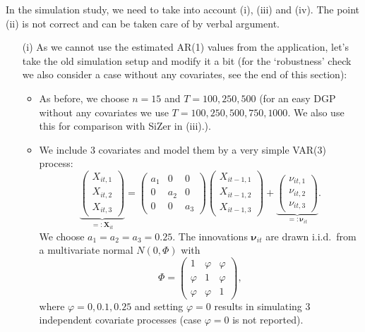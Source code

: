 \documentclass[a4paper,12pt]{article}
\begin{document}
\begin{enumerate}[label=\arabic*.,leftmargin=0.6cm]
{\color{blue}  
In the simulation study, we need to take into account (i), (iii) and (iv). The point (ii) is not correct and can be taken care of by verbal argument.
\begin{itemize}[topsep=0pt]
 
\item[(i)] As we cannot use the estimated AR(1) values from the application, let's take the old simulation setup and modify it a bit {\color{red} (for the `robustness' check we also consider a case without any covariates, see the end of this section)}: 

\begin{itemize}[label=--,leftmargin=0.45cm,itemsep=0pt]

\item As before, we choose $n=15$ and $T=100,250,500$ {\color{red} (for an easy DGP without any covariates we use $T=100,250, 500, 750, 1000$. We also use this for comparison with SiZer in (iii).)}.
  
\item We include $3$ covariates and model them by a very simple VAR(3) process:
\[ \underbrace{\begin{pmatrix} X_{it,1} \\ X_{it,2} \\ X_{it,3} \end{pmatrix}}_{=: \boldsymbol{X}_{it}} = \begin{pmatrix} a_1 & 0 & 0 \\ 0 & a_2 & 0 \\ 0 & 0 & a_3 \end{pmatrix} \begin{pmatrix} X_{it-1,1} \\ X_{it-1,2} \\ X_{it-1,3} \end{pmatrix} + \underbrace{\begin{pmatrix} \nu_{it,1} \\ \nu_{it,2} \\ \nu_{it,3} \end{pmatrix}}_{=: \boldsymbol{\nu}_{it}}. \] 
We choose {\color{red} $a_1 = a_2 = a_3 = 0.25$}. The innovations $\boldsymbol{\nu}_{it}$ are drawn i.i.d.\ from a multivariate normal $N(0,\Phi)$ with
\[ \Phi = \begin{pmatrix} 1 & \varphi & \varphi \\ \varphi & 1 & \varphi \\ \varphi & \varphi & 1 \end{pmatrix}, \]
where $\varphi=0, 0.1, 0.25$ and setting $\varphi = 0$ results in simulating 3 independent covariate processes {\color{red}(case $\varphi = 0$ is not reported)}. 


\end{itemize}
\end{itemize}}
\end{enumerate}
\end{document}

